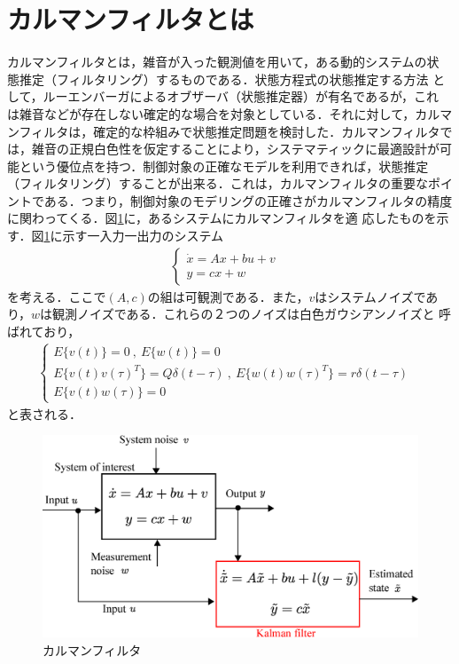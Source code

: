 \documentclass[a4paper,12pt]{jarticle}
\begin{document}
\section{カルマンフィルタとは}
カルマンフィルタとは，雑音が入った観測値を用いて，ある動的システムの状
態推定（フィルタリング）するものである．状態方程式の状態推定する方法
として，ルーエンバーガによるオブザーバ（状態推定器）が有名であるが，これ
は雑音などが存在しない確定的な場合を対象としている．それに対して，カルマ
ンフィルタは，確定的な枠組みで状態推定問題を検討した．カルマンフィルタで
は，雑音の正規白色性を仮定することにより，システマティックに最適設計が可
能という優位点を持つ．制御対象の正確なモデルを利用できれば，状態推定
（フィルタリング）することが出来る．これは，カルマンフィルタの重要なポイ
ントである．つまり，制御対象のモデリングの正確さがカルマンフィルタの精度
に関わってくる．図\ref{fig:kalman_m}に，あるシステムにカルマンフィルタを適
応したものを示す．図\ref{fig:kalman_m}に示す一入力一出力のシステム
\begin{eqnarray}
 \begin{cases}
  \dot{x}=Ax+bu+v & \\
  y = cx + w
  \end{cases}
\end{eqnarray}
を考える．ここで$(A,c)$の組は可観測である．また，$v$はシステムノイズであ
り，$w$は観測ノイズである．これらの２つのノイズは白色ガウシアンノイズと
呼ばれており，
\begin{eqnarray}
 \begin{cases}
  E \bigl\{v(t)\bigr\} = 0 \ , \ E \bigl\{w(t)\bigr\} = 0 & \\
  E \bigl\{v(t)v(\tau)^T\bigr\} = Q\delta (t - \tau) \ , \  E
  \bigl\{w(t)w(\tau)^T\bigr\} = r\delta (t - \tau) & \\
  E \bigl\{v(t)w(\tau)\bigr\} = 0  
 \end{cases}
\end{eqnarray}
と表される．
%
\begin{figure}[tbp]
 \begin{center}
  \includegraphics[width = 150mm]{fig/kalman_model.eps}
 \end{center}
 \caption{カルマンフィルタ}
 \label{fig:kalman_m}
\end{figure}
%
\end{document}
